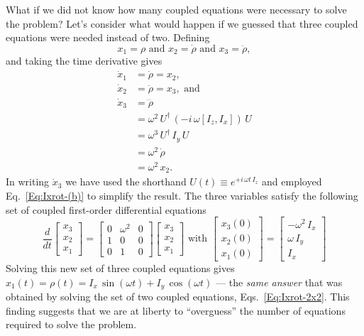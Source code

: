 What if we did not know how many coupled equations were necessary to solve the problem?  Let's consider what would happen if we guessed that three coupled equations were needed instead of two.
Defining
\begin{equation}
x_1 = \rho \text{ and } x_2 = \dot{\rho} \text{ and } x_3 = \ddot{\rho},
\end{equation}
and taking the time derivative gives
\begin{subequations}
\begin{align}
\dot{x}_1 & = \dot{\rho} = x_2, \\
\dot{x}_2 & = \ddot{\rho} = x_3, \text{ and} \\
\dot{x}_3 & = \dddot{\rho} \\
	& = \omega^2 \, U^{\dagger} \, (-i \, \omega [I_z,I_x] ) \, U \\
	& = \omega^3 \, U^{\dagger} \, I_{y} \, U \\
	& = \omega^2 \, \dot{\rho} \\
	& = \omega^2 \, x_2.
\end{align}
\end{subequations}
In writing $\dot{x}_3$ we have used the shorthand $U(t) \equiv e^{+i \, \omega t \, I_z}$ and employed Eq.~\ref{Eq:Ixrot-(b)} to simplify the result.  The three variables satisfy the following set of coupled first-order differential equations
\begin{equation}
\frac{d}{dt} \begin{bmatrix} x_3 \\ x_2 \\ x_1 \end{bmatrix}
	= \begin{bmatrix} 
	    0 & \omega^2 & 0 \\
		1 & 0 & 0 \\
		0 & 1 & 0
	  \end{bmatrix}
	  \begin{bmatrix} 
	  	x_3 \\ x_2 \\ x_1
	   \end{bmatrix}
\text{ with } 
\begin{bmatrix}
    x_3(0) \\
    x_2(0) \\ 
    x_1(0) 
 \end{bmatrix}
=
\begin{bmatrix}
	- \omega^2 \, I_{x} \\ 
	\omega \, I_{y} \\
	I_{x}
\end{bmatrix}
\end{equation}
Solving this new set of three coupled equations gives $x_1(t) = \rho(t) = I_x \, \sin{(\omega t)} + I_y \, \cos{(\omega t)}$ --- the \emph{same answer} that was obtained by solving the set of two coupled equations, Eqs.~\ref{Eq:Ixrot-2x2}.  This finding suggests that we are at liberty to ``overguess'' the number of equations required to solve the problem.

